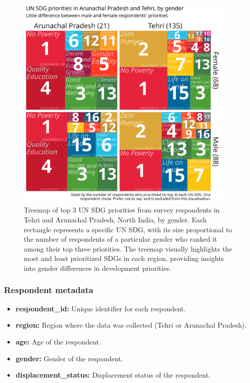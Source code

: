 \documentclass{article}
\begin{document}
\begin{figure}[ht]
  \centering
  \includegraphics[width=0.95\textwidth]{../figures_and_tables/top3-gender-treemap.png}
  \caption{\label{fig:top3-gender-treemap} Treemap of top 3 UN SDG priorities from survey respondents in Tehri and Arunachal Pradesh, North India, by gender. Each rectangle represents a specific UN SDG, with its size proportional to the number of respondents of a particular gender who ranked it among their top three priorities. The treemap visually highlights the most and least prioritized SDGs in each region, providing insights into gender differences in development priorities.}
\end{figure}


\subsubsection{Respondent metadata}

\begin{itemize}
  \item \textbf{respondent\_id:} Unique identifier for each respondent.
  \item \textbf{region:} Region where the data was collected (Tehri or Arunachal Pradesh).
  \item \textbf{age:} Age of the respondent.
  \item \textbf{gender:} Gender of the respondent.
  \item \textbf{displacement\_status:} Displacement status of the respondent.
\end{itemize}
\end{document}
